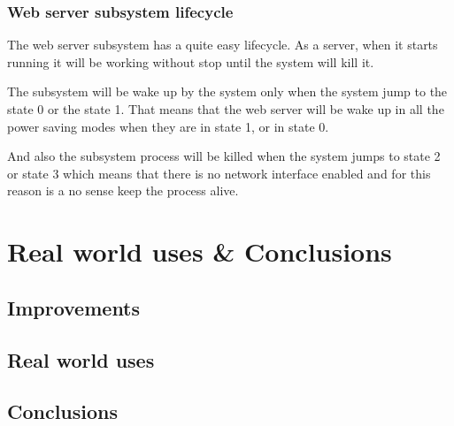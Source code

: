 	\subsection{Web server subsystem lifecycle} %
	The web server subsystem has a quite easy lifecycle. As a server, when it starts running it will be working without stop until the system will kill it. 

	The subsystem will be wake up by the system only when the system jump to the state 0 or the state 1. That means that the web server will be wake up in all the power saving modes when they are in state 1, or in state 0.

	And also the subsystem process will be killed when the system jumps to state 2 or state 3 which means that there is no network interface enabled and for this reason is a no sense keep the process alive.

\chapter{Real world uses \& Conclusions}
	\section{Improvements}
	\section{Real world uses}
	\section{Conclusions}
	\cite{Pravidla}




